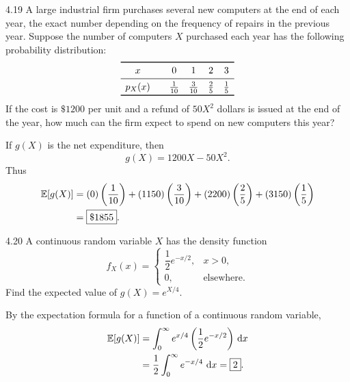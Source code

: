 \documentclass[11pt,oneside]{article}
\begin{document}
\begin{exercise}{4.19}
A large industrial firm purchases several new computers at the end of each year, the exact number depending on the frequency of repairs in the previous year. Suppose the number of computers $X$ purchased each year has the following probability distribution:
\[
\begin{array}{c@{\qquad}cccc}
\toprule
x & 0 & 1 & 2 & 3 \\
\midrule
p_X(x) & \frac{1}{10} & \frac{3}{10} & \frac25 & \frac15 \\
\bottomrule
\end{array}
\]
If the cost is $\$1200$ per unit and a refund of $50X^2$ dollars is issued at the end of the year, how much can the firm expect to spend on new computers this year?
\end{exercise}
\begin{solution}
If $g(X)$ is the net expenditure, then
\[g(X)=1200X-50X^2.\]
Thus
\[
\begin{aligned}
    \mathbb{E}[g(X)]&=(0)\left(\frac{1}{10}\right)+(1150)\left(\frac{3}{10}\right)+(2200)\left(\frac25\right)+(3150)\left(\frac15\right)\\
    &=\boxed{\$1855}.
\end{aligned}
\]
\end{solution}

\begin{exercise}{4.20}
A continuous random variable $X$ has the density function
\[
    f_X(x)=\begin{cases}\dfrac12e^{-x/2},&x>0,\\0,&\text{elsewhere}.\end{cases}
\]
Find the expected value of $g(X)=e^{X/4}$.
\end{exercise}
\begin{solution}
By the expectation formula for a function of a continuous random variable,
\[
\begin{aligned}
    \mathbb{E}[g(X)]&=\int_0^\infty e^{x/4}\left(\frac12e^{-x/2}\right)\,\mathop{}\!\mathrm{d} x\\
    &=\frac12\int_0^\infty e^{-x/4}\,\mathop{}\!\mathrm{d} x=\boxed{2}.
\end{aligned}
\]
\end{solution}
\end{document}

